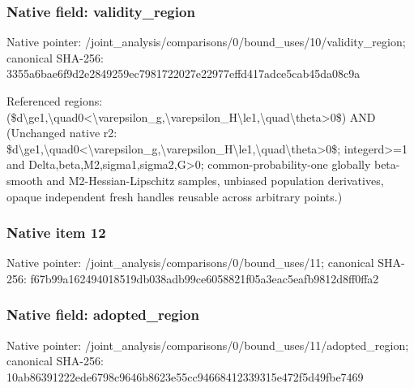 \documentclass[10pt,a4paper]{article}
\begin{document}
\subsubsection{Native field: validity\_\allowbreak{}region}
Native pointer: /joint\_\allowbreak{}analysis/comparisons/0/bound\_\allowbreak{}uses/10/validity\_\allowbreak{}region; canonical SHA-256: 3355a6bae6f9d2e2849259ec7981722027e22977effd417adce5cab45da08c9a

\begingroup\raggedright\sloppy Referenced regions:\allowbreak{} (\$d\textbackslash{}ge1,\allowbreak{}\textbackslash{}quad0<\textbackslash{}varepsilon\_\allowbreak{}g,\allowbreak{}\textbackslash{}varepsilon\_\allowbreak{}H\textbackslash{}le1,\allowbreak{}\textbackslash{}quad\textbackslash{}theta>0\$) AND (Unchanged native r2:\allowbreak{} \$d\textbackslash{}ge1,\allowbreak{}\textbackslash{}quad0<\textbackslash{}varepsilon\_\allowbreak{}g,\allowbreak{}\textbackslash{}varepsilon\_\allowbreak{}H\textbackslash{}le1,\allowbreak{}\textbackslash{}quad\textbackslash{}theta>0\$;\allowbreak{} integerd>=\allowbreak{}1 and Delta,\allowbreak{}beta,\allowbreak{}M2,\allowbreak{}sigma1,\allowbreak{}sigma2,\allowbreak{}G>0;\allowbreak{} common-probability-one globally beta-smooth and M2-Hessian-Lipschitz samples,\allowbreak{} unbiased population derivatives,\allowbreak{} opaque independent fresh handles reusable across arbitrary points.)\par\endgroup

\subsubsection{Native item 12}
Native pointer: /joint\_\allowbreak{}analysis/comparisons/0/bound\_\allowbreak{}uses/11; canonical SHA-256: f67b99a162494018519db038adb99ce6058821f05a3eac5eafb9812d8ff0ffa2

\subsubsection{Native field: adopted\_\allowbreak{}region}
Native pointer: /joint\_\allowbreak{}analysis/comparisons/0/bound\_\allowbreak{}uses/11/adopted\_\allowbreak{}region; canonical SHA-256: 10ab86391222ede6798c9646b8623e55cc94668412339315e472f5d49fbe7469
\end{document}
